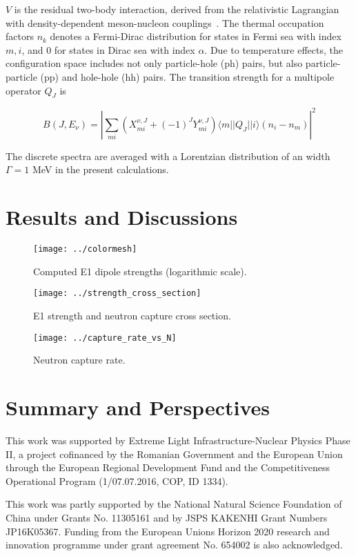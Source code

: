 \documentclass[prc,twocolumn,twoside,showpacs,superscriptaddress,floatfix]{revtex4-1}
\begin{document}
$V$ is the residual two-body interaction, derived from the relativistic
Lagrangian with  density-dependent meson-nucleon couplings~\cite{Niksic}.
The
thermal occupation factors $n_k$ denotes a Fermi-Dirac distribution for states
in Fermi sea with index $m,i$, and $0$ for states in Dirac sea with index
$\alpha$.
Due to temperature effects, the configuration space includes not only
particle-hole (ph) pairs, but also particle-particle (pp) and hole-hole (hh)
pairs.
The transition strength for a multipole operator $Q_J$ is

\begin{equation}
   B(J,E_\nu) = \left | \sum_{mi} (X^{\nu,J}_{mi} +
   (-1)^J Y^{\nu,J}_{mi} ) \langle m || Q_J || i\rangle (n_i
   -n_m) \right |^2
\end{equation}

The discrete spectra are averaged with a Lorentzian distribution of an width
$\Gamma = 1 $ MeV in the present calculations.




\section{Results and Discussions}\label{sec:results}

\begin{figure}[htp]
\centering
\texttt{[image: ../colormesh]}
\caption{\label{fig:e1}Computed E1 dipole strengths (logarithmic scale).}
\end{figure}

\begin{figure}[htp]
\centering
\texttt{[image: ../strength\_cross\_section]}
\caption{\label{fig:e1_xsec}E1 strength and neutron capture cross section.}
\end{figure}

\begin{figure}[htp]
\centering
\texttt{[image: ../capture\_rate\_vs\_N]}
\caption{\label{fig:neutron_capture}Neutron capture rate.}
\end{figure}

\section{Summary and Perspectives}\label{sec:summary}

{}

This work was supported by Extreme Light Infrastructure-Nuclear
Physics Phase II, a project cofinanced by the Romanian Government
and the European Union through the European Regional Development
Fund and the Competitiveness Operational Program (1/07.07.2016,
COP, ID 1334).

This work was partly supported by the National Natural Science Foundation of China
under Grants No. 11305161 and by JSPS KAKENHI Grant Numbers JP16K05367.
Funding from the European Unions Horizon 2020 research and innovation
programme under grant agreement No. 654002 is also
acknowledged.

\clearpage

\end{document}
